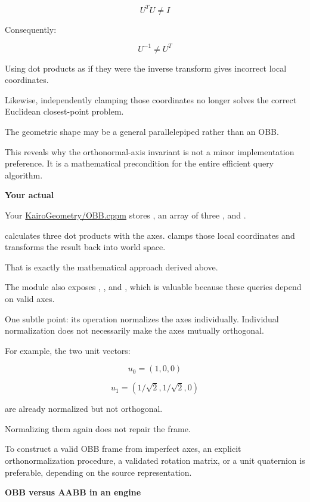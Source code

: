 \[
U^TU\ne I
\]

Consequently:

\[
U^{-1}\ne U^T
\]

Using dot products as if they were the inverse transform gives incorrect local coordinates.

Likewise, independently clamping those coordinates no longer solves the correct Euclidean closest-point problem.

The geometric shape may be a general parallelepiped rather than an OBB.

This reveals why the orthonormal-axis invariant is not a minor implementation preference. It is a mathematical precondition for the entire efficient query algorithm.

\textbf{Your actual }

Your \href{https://github.com/swayam8624/KairoGeometry/blob/master/OBB.cppm?utm_source=chatgpt.com}{KairoGeometry/OBB.cppm} stores , an array of three , and .

 calculates three dot products with the axes.  clamps those local coordinates and transforms the result back into world space.

That is exactly the mathematical approach derived above.

The module also exposes , , and , which is valuable because these queries depend on valid axes.

One subtle point: its  operation normalizes the axes individually. Individual normalization does not necessarily make the axes mutually orthogonal.

For example, the two unit vectors:

\[
u_0=(1,0,0)
\]

\[
u_1=(1/\sqrt2,1/\sqrt2,0)
\]

are already normalized but not orthogonal.

Normalizing them again does not repair the frame.

To construct a valid OBB frame from imperfect axes, an explicit orthonormalization procedure, a validated rotation matrix, or a unit quaternion is preferable, depending on the source representation.

\textbf{OBB versus AABB in an engine}

